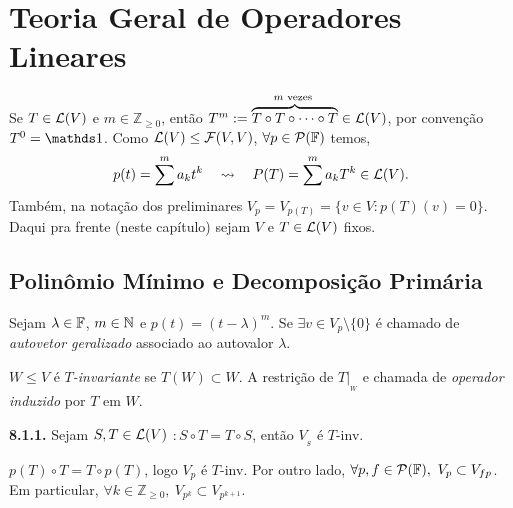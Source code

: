 \section{Teoria Geral de Operadores Lineares}

\vspace{-0.3cm}
Se \(T\in \mathcal{L}(V)\) e \(m \in \mathbb{Z}_{\geq 0}\), então \(T^m := \overbrace{T\circ T \circ \cdots \circ T}^{m\text{ vezes }} \in \mathcal{L}(V)\), por convenção \(T^0 = \id\). Como \(\mathcal{L}(V) \leq \mathcal{F}(V,V)\), \(\forall p \in \mathcal{P}(\mathbb{F})\) temos,  
\[p(t) = \sum^m a_kt^k \ \ \ \leadsto \ \ \ P(T) = \sum^m a_kT^k \in \mathcal{L}(V).\] 
Também, na notação dos preliminares \( V_{p}= V_{{p(T)}} = \{v\in V: p(T)(v) = 0\}\). Daqui pra frente (neste capítulo) sejam \(V\) e  \(T\in \mathcal{L}(V)\) fixos. 


\subsection{Polinômio Mínimo e Decomposição Primária}

\begin{definition}
    Sejam \(\lambda \in \mathbb{F}\), \(m\in \mathbb{N}\) e \(p(t) = (t-\lambda)^m\). Se \(\exists v\in V_p\setminus \{0\}\) é chamado de \emph{autovetor geralizado} associado ao autovalor \(\lambda\).  
\end{definition}

\begin{definition}
    \(W\leq V\) é \emph{\(T\)-invariante} se \(T(W) \subset W\). A restrição de \(T|_{_W}\) e chamada de \emph{operador induzido} por \(T\) em \(W\). 
\end{definition}

\begin{lemma}
    \textbf{8.1.1.} Sejam \(S, T \in \mathcal{L}(V)\)  \(: S\circ T = T \circ S\), então \(V_{_S}\) é \(T\)-inv. %
\end{lemma}

\begin{note}
    \(p(T) \circ T = T\circ p(T)\), logo \(V_p \) é \(T\)-inv. Por outro lado, \(\forall p, f \in \mathcal{P}(\mathbb{F}), \ V_p \subset V_{fp}\). Em particular, \(\forall k \in \mathbb{Z}_{\geq 0}, \ V_{p^k} \subset V_{p^{k+1}}\). 
\end{note}

